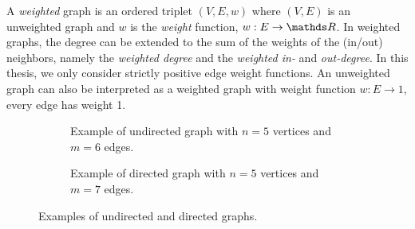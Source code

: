 A \emph{weighted} graph is an ordered triplet $(V, E, w)$ where $(V, E)$ is
an unweighted graph and $w$ is the \emph{weight} function, \ie $w : E
\rightarrow \real$. In weighted graphs, the degree can be extended to the sum of
the weights of the (in/out) neighbors, namely the \emph{weighted degree} and
the \emph{weighted in-} and \emph{out-degree}.
In this thesis, we only consider strictly positive edge weight functions. An
unweighted graph can also be interpreted as a weighted graph with weight
function $w : E \rightarrow 1$, \ie every edge has weight 1.

\begin{figure}[tb]
\centering
\begin{subfigure}[t]{.4\textwidth}
\centering

\caption{Example of undirected graph with $n = 5$ vertices
and $m = 6$ edges.}
\label{fig:undirected-graph}
\end{subfigure}\hfill
\begin{subfigure}[t]{.4\textwidth}
\centering

\caption{Example of directed graph with $n = 5$ vertices
and $m = 7$ edges.}
\label{fig:directed-graph}
\end{subfigure}
\caption{Examples of undirected and directed graphs.}
\end{figure}


